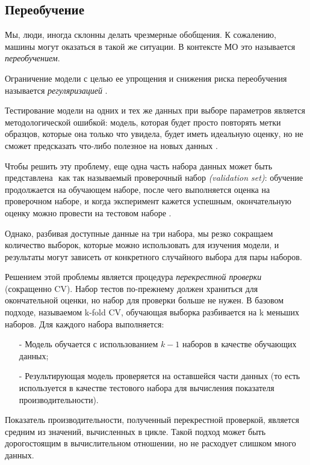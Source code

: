 \subsection{Переобучение}
Мы, люди, иногда склонны делать чрезмерные обобщения. К сожалению, 
машины могут оказаться в такой же ситуации. В контексте МО это называется 
\emph{переобучением}. 

Ограничение модели с целью ее упрощения и снижения риска переобучения 
называется \emph{регуляризацией} \cite{scikitBook}.

Тестирование модели на одних и тех же данных при выборе параметров является 
методологической ошибкой: модель, которая будет просто повторять метки 
образцов, которые она только что увидела, будет иметь идеальную оценку, но 
не сможет предсказать что-либо полезное на новых данных \cite{scikitTuning}. 

Чтобы решить эту проблему, еще одна часть набора данных может быть представлена ​​
как так называемый проверочный набор \emph{(validation set)}: обучение продолжается 
на обучающем наборе, после чего выполняется оценка на проверочном наборе, и 
когда эксперимент кажется успешным, окончательную оценку можно провести на 
тестовом наборе \cite{scikitCV}.

Однако, разбивая доступные данные на три набора, мы резко сокращаем количество 
выборок, которые можно использовать для изучения модели, и результаты могут 
зависеть от конкретного случайного выбора для пары наборов.

Решением этой проблемы является процедура \emph{перекрестной проверки} (сокращенно CV). 
Набор тестов по-прежнему должен храниться для окончательной оценки, но набор для 
проверки больше не нужен. В базовом подходе, называемом k-fold CV, 
обучающая выборка разбивается на k меньших наборов. Для каждого набора 
выполняется:

\begin{itemize}
    \item[-] Модель обучается с использованием $k - 1$ наборов в качестве обучающих данных;
    \item[-] Результирующая модель проверяется на оставшейся части данных (то есть 
    используется в качестве тестового набора для вычисления показателя 
    производительности).
\end{itemize}

Показатель производительности, полученный перекрестной проверкой, является 
средним из значений, вычисленных в цикле. Такой подход может быть дорогостоящим 
в вычислительном отношении, но не расходует слишком много данных.
